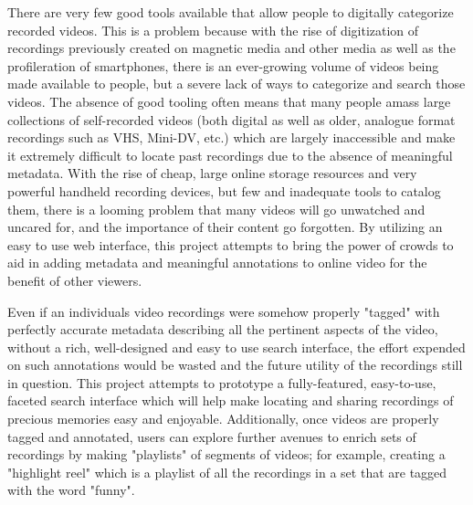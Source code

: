There are very few good tools available that allow people to digitally categorize recorded videos.  This is a problem because with the rise of digitization of recordings previously created on magnetic media and other media as well as the profileration of smartphones, there is an ever-growing volume of videos being made available to people, but a severe lack of ways to categorize and search those videos.  The absence of good tooling often means that many people amass large collections of self-recorded videos (both digital as well as older, analogue format recordings such as VHS, Mini-DV, etc.) which are largely inaccessible and make it extremely difficult to locate past recordings due to the absence of meaningful metadata.  With the rise of cheap, large online storage resources and very powerful handheld recording devices, but few and inadequate tools to catalog them, there is a looming problem that many videos will go unwatched and uncared for, and the importance of their content go forgotten. By utilizing an easy to use web interface, this project attempts to bring the power of crowds to aid in adding metadata and meaningful annotations to online video for the benefit of other viewers. 

Even if an individuals video recordings were somehow properly "tagged" with perfectly accurate metadata describing all the pertinent aspects of the video, without a rich, well-designed and easy to use search interface, the effort expended on such annotations would be wasted and the future utility of the recordings still in question.  This project attempts to prototype a fully-featured, easy-to-use, faceted search interface which will help make locating and sharing recordings of precious memories easy and enjoyable.  Additionally, once videos are properly tagged and annotated, users can explore further avenues to enrich sets of recordings by making "playlists" of segments of videos; for example, creating a "highlight reel" which is a playlist of all the recordings in a set that are tagged with the word "funny".
